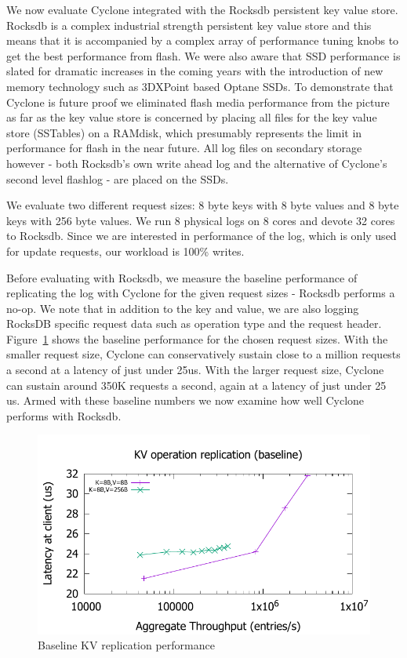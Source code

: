 \documentclass[10pt, preprint, nonatbib]{sigplanconf}
\begin{document}
We now evaluate Cyclone integrated with the Rocksdb persistent key value
store. Rocksdb is a complex industrial strength persistent key value store and
this means that it is accompanied by a complex array of performance tuning knobs
to get the best performance from flash. We were also aware that SSD performance
is slated for dramatic increases in the coming years with the introduction of
new memory technology such as 3DXPoint based Optane SSDs. To demonstrate that
Cyclone is future proof we eliminated flash media performance from the picture
as far as the key value store is concerned by placing all files for the key
value store (SSTables) on a RAMdisk, which presumably represents the limit in
performance for flash in the near future. All log files on secondary storage
however - both Rocksdb's own write ahead log and the alternative of Cyclone's
second level flashlog - are placed on the SSDs.

We evaluate two different request sizes: 8 byte keys with 8 byte values and 8
byte keys with 256 byte values. We run 8 physical logs on 8 cores and devote 32
cores to Rocksdb. Since we are interested in performance of the log, which is
only used for update requests, our workload is 100\% writes.

Before evaluating with Rocksdb, we measure the baseline performance of
replicating the log with Cyclone for the given request sizes - Rocksdb performs
a no-op. We note that in addition to the key and value, we are also logging
RocksDB specific request data such as operation type and the request header.
Figure~\ref{fig:kv_baseline} shows the baseline performance for the chosen
request sizes. With the smaller request size, Cyclone can conservatively sustain
close to a million requests a second at a latency of just under 25us. With the
larger request size, Cyclone can sustain around 350K requests a second, again at
a latency of just under 25 us. Armed with these baseline numbers we now examine
how well Cyclone performs with Rocksdb.

\begin{figure}
\includegraphics[scale=0.6]{results2/kv_baseline.pdf}
\caption{Baseline KV replication performance}
\label{fig:kv_baseline}
\end{figure}
\end{document}
